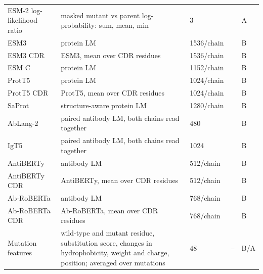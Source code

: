 \begin{longtable}{P{2.8cm}P{4.6cm}P{2.0cm}P{1.5cm}P{1.4cm}}
ESM-2 log-likelihood ratio & masked mutant vs parent log-probability: sum, mean, min & 3 & \citep{Meier2021} & A \\
ESM3 & protein LM & 1536/chain & \citep{Hayes2025} & B \\
ESM3 CDR & ESM3, mean over CDR residues & 1536/chain & \citep{Hayes2025} & B \\
ESM C & protein LM & 1152/chain & \citep{Candido2026} & B \\
ProtT5 & protein LM & 1024/chain & \citep{Elnaggar2022} & B \\
ProtT5 CDR & ProtT5, mean over CDR residues & 1024/chain & \citep{Elnaggar2022} & B \\
SaProt & structure-aware protein LM & 1280/chain & \citep{Su2023SaProt} & B \\
AbLang-2 & paired antibody LM, both chains read together & 480 & \citep{Olsen2024} & B \\
IgT5 & paired antibody LM, both chains read together & 1024 & \citep{Kenlay2024IgT5} & B \\
AntiBERTy & antibody LM & 512/chain & \citep{Ruffolo2021AntiBERTy} & B \\
AntiBERTy CDR & AntiBERTy, mean over CDR residues & 512/chain & \citep{Ruffolo2021AntiBERTy} & B \\
Ab-RoBERTa & antibody LM & 768/chain & \citep{Huh2025} & B \\
Ab-RoBERTa CDR & Ab-RoBERTa, mean over CDR residues & 768/chain & \citep{Huh2025} & B \\
Mutation features & wild-type and mutant residue, substitution score, changes in hydrophobicity, weight and charge, position; averaged over mutations & 48 & -- & B/A \\
\end{longtable}

